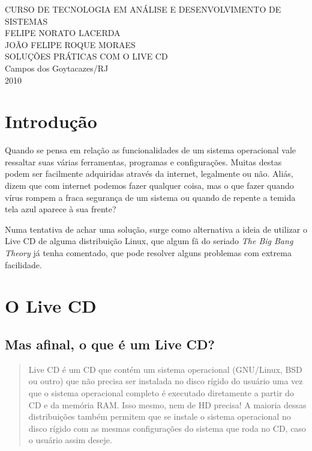 \documentclass[12pt, a4paper, tocpage=plain]{abnt} %
\begin{document}

\begin{titlepage}
 \begin{center}
   {\large CURSO DE TECNOLOGIA EM ANÁLISE E DESENVOLVIMENTO DE SISTEMAS} \\ [3.5cm]
   {\large FELIPE NORATO LACERDA} \\
   {\large JOÃO FELIPE ROQUE MORAES} \\ [4cm]
   {\large SOLUÇÕES PRÁTICAS COM O LIVE CD} \\
   \vfill
   {\large Campos dos Goytacazes/RJ} \\
   {\large 2010}
 \end{center}
\end{titlepage}

\tableofcontents

\chapter{Introdução}


Quando se pensa em relação as funcionalidades de um sistema operacional vale ressaltar suas várias ferramentas, programas e configurações. Muitas destas podem ser facilmente adquiridas através da internet, legalmente ou não. Aliás, dizem que com internet podemos fazer qualquer coisa, mas o que fazer quando vírus rompem a fraca segurança de um sistema ou quando de repente a temida tela azul aparece à sua frente? 

Numa tentativa de achar uma solução, surge como alternativa a ideia de utilizar  o Live CD de alguma distribuição Linux, que algum fã do seriado {\it The Big Bang Theory} já tenha comentado, que pode resolver alguns problemas com extrema facilidade.


\chapter{O Live CD}

\section{Mas afinal, o que é um Live CD?}

\begin{quote}
Live CD é um CD que contém um sistema operacional (GNU/Linux, BSD ou outro) que não precisa ser instalada no disco rígido do usuário uma vez que o sistema operacional completo é executado diretamente a partir do CD e da memória RAM. Isso mesmo, nem de HD precisa! A maioria dessas distribuições também permitem que se instale o sistema operacional no disco rígido com as mesmas configurações do sistema que roda no CD, caso o usuário assim deseje.
\end{quote}
\end{document}
